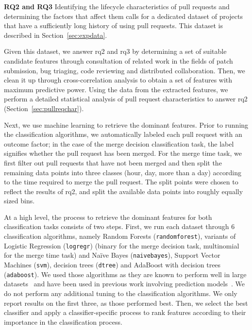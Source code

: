 \documentclass{sig-alternate}
\begin{document}
{\bfseries RQ2 and RQ3}
Identifying the lifecycle characteristics of pull requests and determining the
factors that affect them calls for a dedicated dataset of projects that have a
sufficiently long history of using pull requests. This dataset is described in
Section~\ref{sec:expdata}.

Given this dataset, we answer {\sc rq2} and {\sc rq3} by determining a set of
suitable candidate features through consultation of related work in the fields
of patch submission, bug triaging, code reviewing and distributed collaboration.
Then, we clean it up through cross-correlation analysis to obtain a set of
features with maximum predictive power. Using the data from the extracted
features, we perform a detailed statistical analysis of pull request
characteristics to answer {\sc rq2} (Section~\ref{sec:pullreqchar}).

Next, we use machine learning to retrieve the dominant
features. Prior to running the classification algorithms, we automatically labeled
each pull request with an outcome factor; in the case of the \textsf{merge
decision} classification task, the label signifies whether the pull request has
been merged. For the \textsf{merge time} task, we first filter out pull requests
that have not been merged and then split the remaining data points into three
classes (\textsf{hour}, \textsf{day}, \textsf{more than a day}) according to the time
required to merge the pull request. The split points were chosen to reflect the
results of {\sc rq2}, and split the available data points into roughly equally
sized bins.

At a high level, the process to retrieve the dominant features for both
classification tasks consists of two steps.  First, we run each dataset through
6 classification algorithms, namely Random Forests (\texttt{randomforest}),
variants of Logistic Regression (\texttt{logregr}) (binary for the \textsf{merge
decision} task, multinomial for the \textsf{merge time} task) and Na\"ive Bayes
(\texttt{naivebayes}), Support Vector Machines (\texttt{svm}), decision trees
(\texttt{dtree}) and AdaBoost with decision trees (\texttt{adaboost}). We used
those algorithms as they are known to perform well in large
datasets~\cite{Lessm08} and have been used in previous work involving prediction
models~\cite{Giger12}. We do not perform any additional tuning to the
classification algorithms. We only report results on the first three, as those
performed best. Then, we select the best classifier and apply a
classifier-specific process to rank features according to their importance in
the classification process. 
\end{document}
